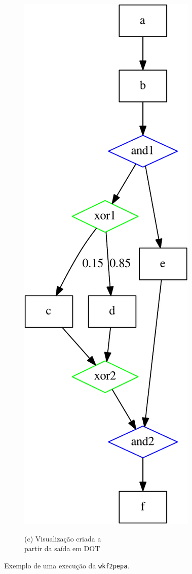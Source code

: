\documentclass[a4paper,10pt]{article}
\begin{document}
\begin{figure}[h]
\begin{subfigure}[b]{0.4\textwidth}
                \includegraphics[scale=0.55]{example-crop.pdf}

                (c) Visualização criada a \\ partir da saída em DOT
                \label{fig:tiger}
        \end{subfigure}
        \caption{Exemplo de uma execução da \texttt{wkf2pepa}.}
        \label{fig:exemplo}
\end{figure}
\end{document}
